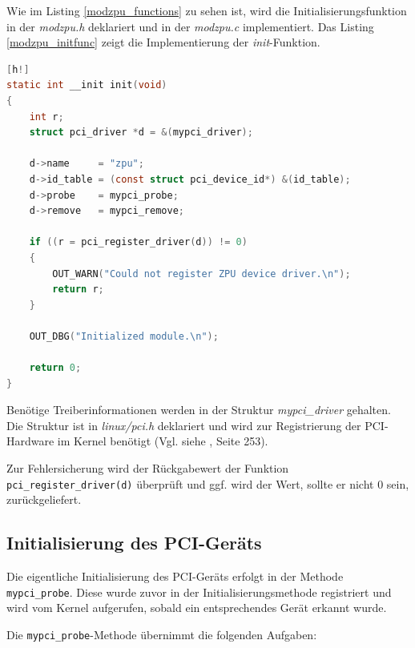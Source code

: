 \documentclass[11pt]{scrartcl}
\begin{document}
Wie im Listing \ref{modzpu_functions} zu sehen ist, wird die Initialisierungsfunktion in der \textit{modzpu.h} deklariert und in der \textit{modzpu.c} implementiert. Das Listing \ref{modzpu_initfunc} zeigt die Implementierung der \textit{init}-Funktion.

\begin{lstlisting}[language=C, firstnumber=67, label=modzpu_initfunc, caption=modzpu Init-Funktion][h!]
static int __init init(void)
{
	int r;
	struct pci_driver *d = &(mypci_driver);

	d->name     = "zpu";
	d->id_table = (const struct pci_device_id*) &(id_table);
	d->probe    = mypci_probe;
	d->remove   = mypci_remove;

	if ((r = pci_register_driver(d)) != 0)
	{
		OUT_WARN("Could not register ZPU device driver.\n");
		return r;
	}

	OUT_DBG("Initialized module.\n");

	return 0;
}
\end{lstlisting}

Benötige Treiberinformationen werden in der Struktur \textit{mypci\_driver} gehalten. Die Struktur ist in \textit{linux/pci.h} deklariert und wird zur Registrierung der PCI-Hardware im Kernel benötigt (Vgl. siehe \cite{script_hwstp}, Seite 253).
 
Zur Fehlersicherung wird der Rückgabewert der Funktion \texttt{pci\_register\_driver(d)} überprüft und ggf. wird der Wert, sollte er nicht 0 sein, zurückgeliefert. 

\subsection{Initialisierung des PCI-Geräts}
\label{modzpu_init}

Die eigentliche Initialisierung des PCI-Geräts erfolgt in der Methode \texttt{mypci\_probe}. Diese wurde zuvor in der Initialisierungsmethode registriert und wird vom Kernel aufgerufen, sobald ein entsprechendes Gerät erkannt wurde.

Die \texttt{mypci\_probe}-Methode übernimmt die folgenden Aufgaben:
\end{document}
